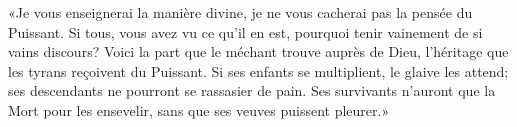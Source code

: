 «Je vous enseignerai la manière divine, je ne vous cacherai pas la pensée du Puissant.
Si tous, vous avez vu ce qu’il en est,
	pourquoi tenir vainement de si vains discours?
Voici la part que le méchant trouve auprès de Dieu,
	l’héritage que les tyrans reçoivent du Puissant.
Si ses enfants se multiplient, le glaive les attend;
	ses descendants ne pourront se rassasier de pain.
Ses survivants n’auront que la Mort pour les ensevelir,
	sans que ses veuves puissent pleurer.»
